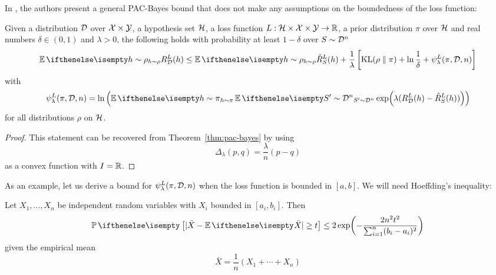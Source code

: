 In \cite{alquier2016properties}, the authors present a general PAC-Bayes bound
that does not make any assumptions on the boundedness of the loss function:

\begin{theorem}
  Given a distribution $\mathcal{D}$ over $\mathcal{X} \times \mathcal{Y}$, a hypothesis set $\mathcal{H}$, a
  loss function $L : \mathcal{H} \times \mathcal{X} \times \mathcal{Y} \to \mathbb{R}$, a prior distribution
  $\pi$ over $\mathcal{H}$ and real numbers $\delta \in (0, 1)$ and $\lambda > 0$, the
  following holds with probability at least $1 - \delta$ over $S \sim \mathcal{D}^n$
  \begin{equation}
    \label{eq:alquier-bound}
    \Ev[h \sim \rho]{R_\CD^L(h)} \leq \Ev[h \sim \rho]{\hat{R}_S^L(h)} +
    \frac{1}{\lambda}\left[\KL{\rho}{\pi} + \ln \frac{1}{\delta} +
    \psi_\lambda^L(\pi, \CD, n)\right]
  \end{equation}
  with
  \begin{equation}
    \psi_\lambda^L(\pi, \CD, n) = \ln\left(\Ev[h \sim \pi]{\Ev[S' \sim
    \CD^n]{\exp(\lambda(R_\CD^L(h) - \hat{R}_S^L(h)))}}\right)
  \end{equation}
  for all distributions $\rho$ on $\mathcal{H}$.
\end{theorem}

\begin{proof}
  This statement can be recovered from Theorem~\ref{thm:pac-bayes} by using
  \begin{equation}
    \Delta_\lambda(p, q) = \frac{\lambda}{n} (p - q)
  \end{equation}
  as a convex function with $I = \mathbb{R}$.
\end{proof}

As an example, let us derive a bound for $\psi_\lambda^L(\pi, \mathcal{D}, n)$ when the
loss function is bounded in $[a, b]$. We will need Hoeffding's inequality:

\begin{lemma}
  Let $X_1, \ldots, X_n$ be independent random variables with $X_i$ bounded in
  $[a_i, b_i]$. Then
  \begin{equation}
    \Pr{| \bar{X} - \Ev{\bar{X}} | \geq t} \leq 2 \exp(- \frac{2 n^2
    t^2}{\sum_{i = 1}^n (b_i - a_i)^2})
  \end{equation}
  given the empirical mean
  \begin{equation}
    \bar{X} = \frac{1}{n}(X_1 + \cdots + X_n)
  \end{equation}
\end{lemma}

\begin{theorem}
\end{theorem}

